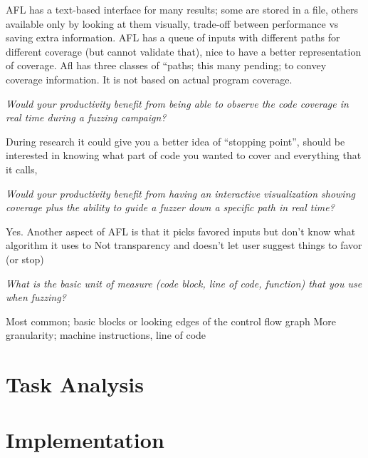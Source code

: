 \documentclass{article}
\begin{document}
AFL has a text-based interface for many results; some are stored in a file, others available only by looking at them visually, trade-off between performance vs saving extra information. AFL has a queue of inputs with different paths for different coverage (but cannot validate that), nice to have a better representation of coverage. 
Afl has three classes of “paths; this many pending; to convey coverage information. It is not based on actual program coverage. 

\textit{Would your productivity benefit from being able to observe the code coverage in real time during a fuzzing campaign?}

During research it could give you a better idea of “stopping point”, should be interested in knowing what part of code you wanted to cover and everything that it calls, 

\textit{Would your productivity benefit from having an interactive visualization showing coverage plus the ability to guide a fuzzer down a specific path in real time?}

Yes.
Another aspect of AFL is that it picks favored inputs but don’t know what algorithm it uses to
Not transparency and doesn’t let user suggest things to favor (or stop)

\textit{What is the basic unit of measure (code block, line of code, function) that you use when fuzzing?}

Most common; basic blocks or looking edges of the control flow graph
More granularity; machine instructions, line of code



\section{Task Analysis}

\section{Implementation}



\end{document}
